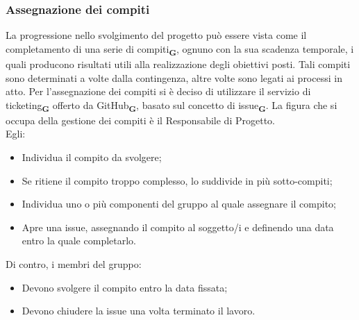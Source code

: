 \subsubsection{Assegnazione dei compiti}
La progressione nello svolgimento del progetto può essere vista come il completamento di una serie di compiti\textsubscript{\textbf{G}}, ognuno con la sua scadenza temporale, i quali producono risultati utili alla realizzazione degli obiettivi posti. Tali compiti sono determinati a volte dalla contingenza, altre volte sono legati ai processi in atto. Per l’assegnazione dei compiti si è deciso di utilizzare il servizio di ticketing\textsubscript{\textbf{G}} offerto da GitHub\textsubscript{\textbf{G}}, basato sul concetto di issue\textsubscript{\textbf{G}}. La figura che si occupa della gestione dei compiti è il Responsabile di Progetto.\\
Egli:
\begin {itemize}
    \item Individua il compito da svolgere;
    \item Se ritiene il compito troppo complesso, lo suddivide in più sotto-compiti;
    \item Individua uno o più componenti del gruppo al quale assegnare il compito;
    \item Apre una issue, assegnando il compito al soggetto/i e definendo una data entro la quale completarlo.
\end {itemize}
Di contro, i membri del gruppo:
\begin {itemize}
    \item Devono svolgere il compito entro la data fissata;
    \item Devono chiudere la issue una volta terminato il lavoro.
\end {itemize}
